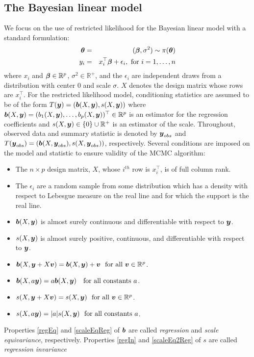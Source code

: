 \documentclass[ba]{imsart}
\makeatletter
\def\bth{\mbox{\boldmath $\theta$}}
\def\bbeta{\mbox{\boldmath $\beta$}}
\newcommand{\by}{\mbox{\boldmath $y$}}
\newcommand{\bv}{\mbox{\boldmath $v$}}
\newcommand{\bb}{\mbox{\boldmath $b$}}
\newcommand{\labitem}[2]{%
\def\@itemlabel{\textbf{#1}{.}}
\item
\def\@currentlabel{#1}\label{#2}}
\makeatother
\begin{document}
\subsection{The Bayesian linear model}
We focus on the use of restricted likelihood for the Bayesian linear
model with a standard formulation: 
\begin{eqnarray}
\label{LinearModel}
\bth&=&(\bbeta,\sigma^2) \sim  \pi(\bth) 
\nonumber\\
y_i  & =  & x_i^\top \bbeta + \epsilon_i , \mbox{ for } i = 1, \ldots, n 
\end{eqnarray}
where $x_i$ and $\bbeta \in \mathbb{R}^p$, $\sigma^2 \in \mathbb{R}^+$, 
and the $\epsilon_i$ are independent draws from a distribution with center $0$ and scale $\sigma$. $X$ denotes the design matrix whose rows are  $x_i^\top$. For the restricted likelihood model,  conditioning statistics are assumed to be of the form $T(\by) = (\bb(X, \by), s(X, \by))$ where $\bb(X, \by)= (b_1(X,\by), \dots,b_p(X,\by))^\top\in \mathbb R^{p}$ is an estimator for the regression coefficients and $s(X, \by)\in \{0\} \cup {\mathbb R}^+$ is an estimator of the scale. Throughout, observed data and summary statistic is denoted by $\by_{obs}$ and $T(\by_{obs})=(\bb(X, \by_{obs}), s(X, \by_{obs}))$, respectively. 
Several conditions are imposed on the model and statistic to ensure validity of the MCMC algorithm:
\begin{itemize}
\labitem{C1}{fullRank} The $n \times p$ design matrix, $X$, whose $i^{th}$ row is $x_i^\top$, 
is of full column rank.  
\labitem{C2}{supReal} The $\epsilon_i$ are a random sample from some distribution which has a density with 
respect to Lebesgue measure on the real line and for which the support is the real line.  
\labitem{C3}{asb}$\bb(X,\by)$ is almost surely continuous and differentiable with respect to $\by$.  
\labitem{C4}{as} $s(X,\by)$ is almost surely positive, continuous, and differentiable with respect to $\by$.  
\labitem{C5}{regEq} $\bb(X,\by+X\bv)=\bb(X,\by)+\bv \ \ \text{for  all}\ \bv\in\mathbb{R}^p$. 
\labitem{C6}{scaleEqReg} $\bb(X,a\by)=a\bb(X,\by)\ \ \ \text{for all constants } a$.  
\labitem{C7}{regIn} $s(X,\by+X\bv)=s(X,\by) \ \ \text{for all}\ \bv\in\mathbb{R}^p$.  
\labitem{C8}{scaleEq2Reg} $s(X, a\by)=|a|s(X,\by) \ \ \text{for all constants } a$.  
\end{itemize}
Properties \ref{regEq} and \ref{scaleEqReg} of $\bb$ are called
\textit{regression} and \textit{scale equivariance},
respectively.  Properties \ref{regIn} and \ref{scaleEq2Reg} of $s$ are called \textit{regression invariance}
\end{document}
